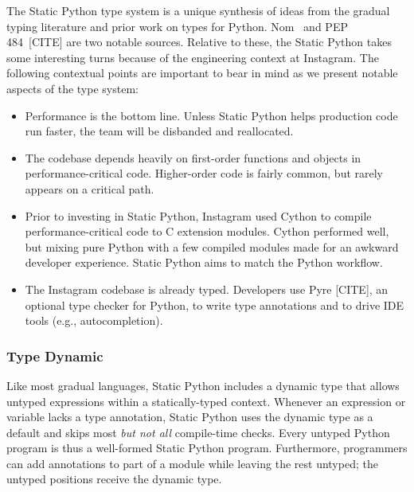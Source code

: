\documentclass[english,cleveref,submission]{programming}
\newcommand{\SP}{Static Python}
\begin{document}
The \SP{} type system is a unique synthesis of ideas from the gradual typing literature
and prior work on types for Python.
Nom~\cite{mt-oopsla-2017,mt-oopsla-2021} and PEP 484~[CITE] are two notable sources.
Relative to these, the \SP{} takes some interesting turns
because of the engineering context at Instagram.
The following contextual points are important to bear in mind as we present
notable aspects of the type system:
\begin{itemize}
  \item
    Performance is the bottom line.
    Unless \SP{} helps production code run faster, the team will be disbanded
    and reallocated.
  \item
    The codebase depends heavily on first-order functions and objects in
    performance-critical code.
    Higher-order code is fairly common, but rarely appears on a critical path.
  \item
    Prior to investing in \SP{}, Instagram used Cython to compile
    performance-critical code to C extension modules.
    Cython performed well, but mixing pure Python with a few compiled modules
    made for an awkward developer experience.
    \SP{} aims to match the Python workflow.
  \item
    The Instagram codebase is already typed.
    Developers use Pyre [CITE], an optional type checker for Python,
    to write type annotations and to drive IDE tools (e.g., autocompletion).
\end{itemize}



\subsubsection{Type Dynamic}
\label{s:type-dynamic}


Like most gradual languages, \SP{} includes a dynamic type
that allows untyped expressions within a statically-typed context.
Whenever an expression or variable lacks a type annotation, \SP{} uses the
dynamic type as a default and skips most \emph{but not all}\/ compile-time checks.
Every untyped Python program is thus a well-formed \SP{} program.
Furthermore, programmers can add annotations to part of a module
while leaving the rest untyped; the untyped positions receive the dynamic type.
\end{document}
